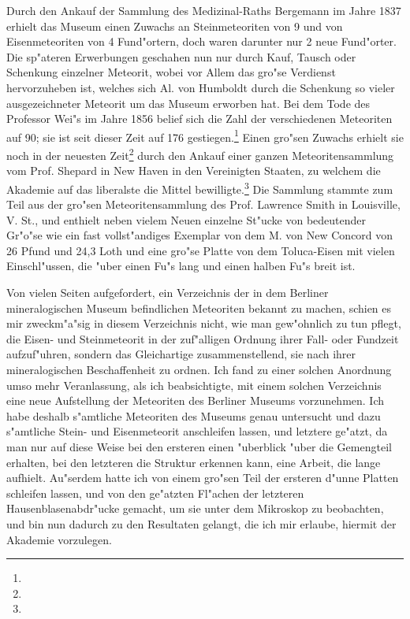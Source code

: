 \documentclass[a4paper, 11pt, oneside]{article}
\begin{document}
Durch den Ankauf der Sammlung des Medizinal-Raths Bergemann im Jahre 1837 erhielt das Museum einen Zuwachs an Steinmeteoriten von 9 und von Eisenmeteoriten von 4 Fund"ortern, doch waren darunter nur 2 neue Fund"orter. Die sp"ateren Erwerbungen geschahen nun nur durch Kauf, Tausch oder Schenkung einzelner Meteorit, wobei vor Allem das gro"se Verdienst hervorzuheben ist, welches sich Al. von Humboldt durch die Schenkung so vieler ausgezeichneter Meteorit um das Museum erworben hat. Bei dem Tode des Professor Wei"s im Jahre 1856 belief sich die Zahl der verschiedenen Meteoriten auf 90; sie ist seit dieser Zeit auf 176 gestiegen.\footnote{} Einen gro"sen Zuwachs erhielt sie noch in der neuesten Zeit\footnote{} durch den Ankauf einer ganzen Meteoritensammlung vom Prof. Shepard in New Haven in den Vereinigten Staaten, zu welchem die Akademie auf das liberalste die Mittel bewilligte.\footnote{} Die Sammlung stammte zum Teil aus der gro"sen Meteoritensammlung des Prof. Lawrence Smith in Louisville, V. St., und enthielt neben vielem Neuen einzelne St"ucke von bedeutender Gr"o"se wie ein fast vollst"andiges Exemplar von dem M. von New Concord von 26 Pfund und 24,3 Loth und eine gro"se Platte von dem Toluca-Eisen mit vielen Einschl"ussen, die "uber einen Fu"s lang und einen halben Fu"s breit ist.

Von vielen Seiten aufgefordert, ein Verzeichnis der in dem Berliner mineralogischen Museum befindlichen Meteoriten bekannt zu machen, schien es mir zweckm"a"sig in diesem Verzeichnis nicht, wie man gew"ohnlich zu tun pflegt, die Eisen- und Steinmeteorit in der zuf"alligen Ordnung ihrer Fall- oder Fundzeit aufzuf"uhren, sondern das Gleichartige zusammenstellend, sie nach ihrer mineralogischen Beschaffenheit zu ordnen. Ich fand zu einer solchen Anordnung umso mehr Veranlassung, als ich beabsichtigte, mit einem solchen Verzeichnis eine neue Aufstellung der Meteoriten des Berliner Museums vorzunehmen. Ich habe deshalb s"amtliche Meteoriten des Museums genau untersucht und dazu s"amtliche Stein- und Eisenmeteorit anschleifen lassen, und letztere ge"atzt, da man nur auf diese Weise bei den ersteren einen "uberblick "uber die Gemengteil erhalten, bei den letzteren die Struktur erkennen kann, eine Arbeit, die lange aufhielt. Au"serdem hatte ich von einem gro"sen Teil der ersteren d"unne Platten schleifen lassen, und von den ge"atzten Fl"achen der letzteren Hausenblasenabdr"ucke gemacht, um sie unter dem Mikroskop zu beobachten, und bin nun dadurch zu den Resultaten gelangt, die ich mir erlaube, hiermit der Akademie vorzulegen.
\end{document}
